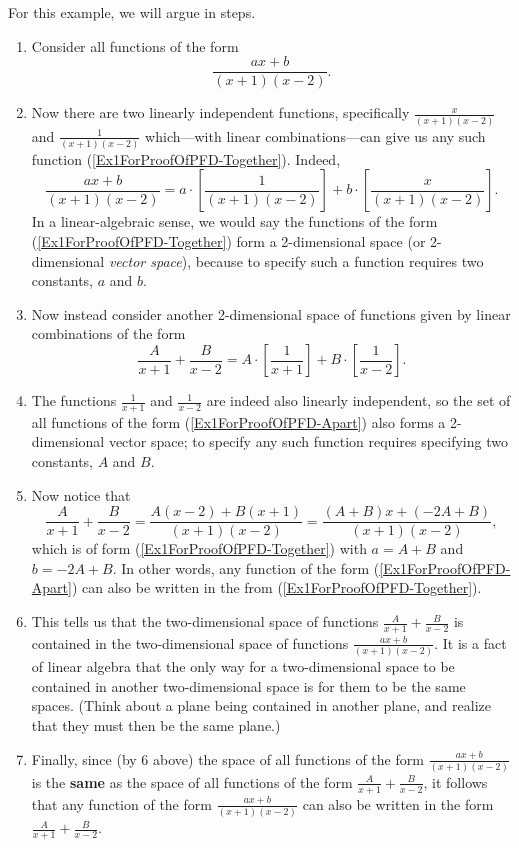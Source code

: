 \bex For this example, we will argue in steps.
\begin{enumerate}
\item Consider all functions of the form 
\begin{equation}\frac{a x+b}{(x+1)(x-2)}.\label{Ex1ForProofOfPFD-Together}
\end{equation}
\item Now there are two linearly independent\footnotemark
functions, specifically $\frac{x}{(x+1)(x-2)}$
and $\frac1{(x+1)(x-2)}$ which---with linear combinations---can give us
any such function (\ref{Ex1ForProofOfPFD-Together}).  Indeed,
$$\frac{ax+b}{(x+1)(x-2)}=a\cdot\left[\frac1{(x+1)(x-2)}\right]
                         +b\cdot\left[\frac{x}{(x+1)(x-2)}\right].$$
In a linear-algebraic sense, we would say the functions of the
form (\ref{Ex1ForProofOfPFD-Together}) form a 2-dimensional space
(or 2-dimensional {\it vector space}), because to specify such
a function requires two constants, $a$ and $b$.

\item Now instead consider another 2-dimensional space of functions
given by linear combinations of the form
\begin{equation}
\frac{A}{x+1}+\frac{B}{x-2}
=A\cdot\left[\frac1{x+1}\right]+B\cdot\left[\frac1{x-2}\right].
\label{Ex1ForProofOfPFD-Apart}
\end{equation}
\item 
The functions $\frac1{x+1}$ and $\frac{1}{x-2}$ are indeed also linearly
independent, so the set of all functions of the form
(\ref{Ex1ForProofOfPFD-Apart}) also forms a 2-dimensional
vector space; to specify any such function requires
specifying two constants, $A$ and $B$.

\item Now notice that 
$$\frac{A}{x+1}+\frac{B}{x-2}
=\frac{A(x-2)+B(x+1)}{(x+1)(x-2)}
=\frac{(A+B)x+(-2A+B)}{(x+1)(x-2)},$$
which is of form (\ref{Ex1ForProofOfPFD-Together})
with $a=A+B$ and $b=-2A+B$.  In other words, any function of the
form (\ref{Ex1ForProofOfPFD-Apart}) can also be written in the 
from (\ref{Ex1ForProofOfPFD-Together}).
\item This tells us that the two-dimensional space
of functions $\frac{A}{x+1}+\frac{B}{x-2}$ is contained in the
two-dimensional space of functions $\frac{ax+b}{(x+1)(x-2)}$.
It is a fact of linear algebra that the only way for a
two-dimensional space to be contained in another two-dimensional
space is for them to be the same spaces.  (Think about 
a plane being contained in another plane, and realize that
they must then be the same plane.)

\item Finally, since (by 6 above) the space of all functions
of the form $\frac{ax+b}{(x+1)(x-2)}$ is the {\bf same} as the 
space of all functions of the form
$\frac{A}{x+1}+\frac{B}{x-2}$, it follows that
any function of the form $\frac{ax+b}{(x+1)(x-2)}$
can also be written in the form $\frac{A}{x+1}+\frac{B}{x-2}$.
\end{enumerate}
